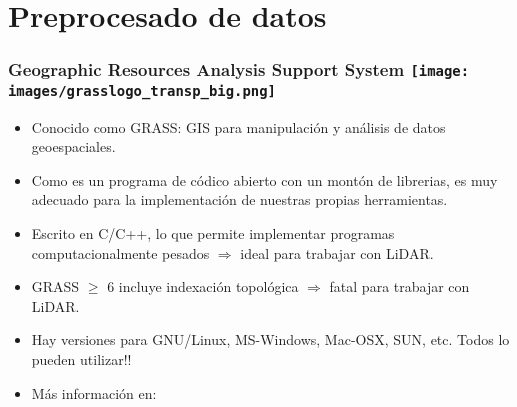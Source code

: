 \section{Preprocesado de datos}
\begin{frame}
 \frametitle{Geographic Resources Analysis Support System\hfill 
   \texttt{[image: images/grasslogo\_transp\_big.png]}} 
 \begin{itemize}
    \item Conocido como \alert<1>{GRASS}: GIS para manipulación y 
      análisis de datos geoespaciales.
    \item Como es un programa de \alert{códico abierto} con un 
      montón de librerias, es muy adecuado para la implementación 
      de nuestras propias herramientas.
    \item Escrito en C/C++, lo que permite implementar programas 
      computacionalmente pesados $\Rightarrow$ \alert{ideal} 
      para trabajar con LiDAR.
    \item GRASS $\geq$ 6 incluye indexación topológica $\Rightarrow$ 
      \alert{fatal} para trabajar con LiDAR.
    \item Hay versiones para GNU/Linux, MS-Windows, Mac-OSX, SUN, etc. 
      \alert{\textexclamdown\textexclamdown Todos lo pueden utilizar!!}
    \item Más información en:  
  \end{itemize}
\end{frame}
